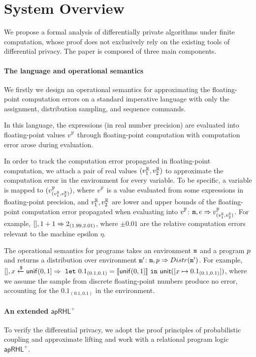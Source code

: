 \documentclass[a4paper,11pt]{article}
\begin{document}
\section{System Overview}
We propose a formal analysis of differentially private algorithms under finite computation, whose proof does not exclusively rely on the existing tools of differential privacy. The paper is composed of three main components.
%
\paragraph{The language and operational semantics}
We firstly we design an operational semantics for approximating the floating-point computation errors on a standard imperative language with only the assignment, distribution sampling, and sequence commands.

In this language, the expressions (in real number precision) are evaluated into floating-point values $v^{\mathbb{F}}$ through floating-point computation with computation error arose during evaluation. 

In order to track the computation error propagated in floating-point computation, we attach a pair of real values $(v^{\mathbb{R}}_1, v^{\mathbb{R}}_2)$ to approximate the computation error in the environment for every variable. 
To be specific,
a variable is mapped to $(v^{\mathbb{F}}_{(v^{\mathbb{R}}_1, v^{\mathbb{R}}_2)})$, where $v^{\mathbb{F}}$ is a value evaluated from some expressions in floating-point precision,
and $v^{\mathbb{R}}_1, v^{\mathbb{R}}_2$ are lower and upper bounds of the floating-point computation error propagated when evaluating into $v^{\mathbb{F}}$: 
$\mathtt{m}, e \Rightarrow v^{\mathbb{F}}_{(v^{\mathbb{R}}_1, v^{\mathbb{R}}_2)}$.
%
For example, $[], 1 + 1 \Rightarrow 2_{(1.99, 2.01)}$, where $\pm 0.01$ are the relative computation errors relevant to the machine epsilon $\eta$.

The operational semantics for programs takes an environment $\mathtt{m}$ and a program $p$ and returns a distribution over environment $\mathtt{m}'$: $\mathtt{m}, p \Rightarrow Distr(\mathtt{m}')$. 
For example, $[], x \xleftarrow{\$} \mathsf{unif}(0,1] \Rightarrow 
~\mathtt{let}~ 0.1_{(0.1, 0.1)} = \llbracket \mathsf{unif}(0,1] \rrbracket ~\mathtt{in}~ \mathsf{unit}([x \mapsto 0.1_{(0.1, 0.1)}])$, 
where we assume the sample from discrete floating-point numbers produce no error, accounting for the $0.1_{(0.1, 0.1)}$ in the environment.

%
\paragraph{An extended $\mathsf{apRHL}^+$} 
To verify the differential privacy, we adopt the proof principles of probabilistic coupling and approximate lifting and work with a relational program logic
$\mathsf{apRHL}^+$.
\end{document}
